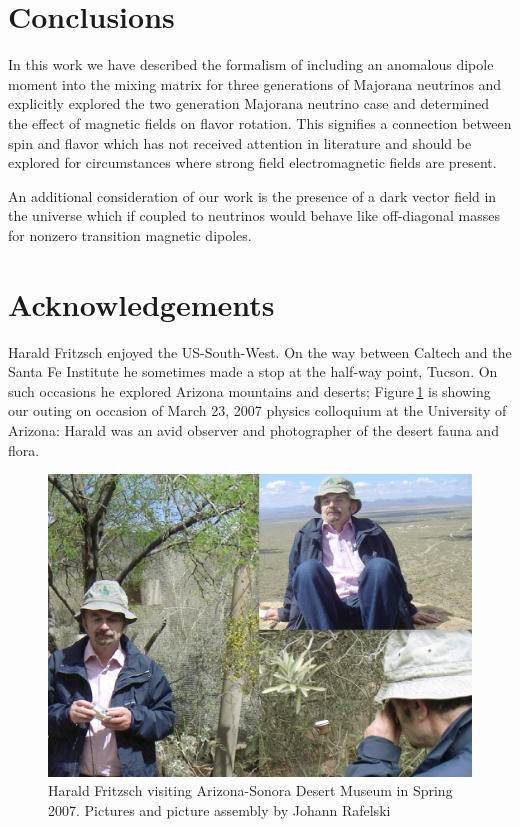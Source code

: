 \documentclass[addchapnum]{ws-rv961x669} %
\begin{document}
\section{Conclusions}
In this work we have described the formalism of including an anomalous dipole moment into the mixing matrix for three generations of Majorana neutrinos and explicitly explored the two generation Majorana neutrino case and determined the effect of magnetic fields on flavor rotation. This signifies a connection between spin and flavor which has not received attention in literature and should be explored for circumstances where strong field electromagnetic fields are present.

An additional consideration of our work is the presence of a dark vector field in the universe which if coupled to neutrinos would behave like off-diagonal masses for nonzero transition magnetic dipoles.

\section*{Acknowledgements}
Harald Fritzsch enjoyed the US-South-West. On the way between Caltech and the Santa Fe Institute he sometimes made a stop at the half-way point, Tucson. On such occasions he explored Arizona mountains and  deserts; Figure\,\ref{Fig:AZcolloq2007} is showing our outing on occasion of March 23, 2007 physics colloquium at the University of Arizona: Harald was an avid observer and photographer of the desert fauna and flora. 
 
\begin{figure}%
\centerline{\includegraphics[width=0.95\columnwidth]{07March24HaraldCollageDesertMuseum.jpg}}
\caption{Harald Fritzsch visiting Arizona-Sonora Desert Museum in Spring 2007. Pictures and picture assembly by Johann Rafelski
}
\label{Fig:AZcolloq2007} 
\end{figure}
\end{document}
